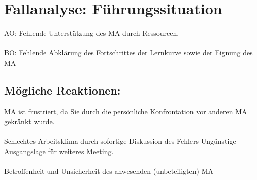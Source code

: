 \section{Fallanalyse: Führungssituation}
\ac{AO}: Fehlende Unterstützung des MA durch Ressourcen.\\
\\
\ac{BO}: Fehlende Abklärung des Fortschrittes der Lernkurve sowie der Eignung des \ac{MA}

\subsection*{Mögliche Reaktionen:}

\ac{MA} ist frustriert, da Sie durch die persönliche Konfrontation vor anderen \ac{MA} gekränkt wurde. \\
\\
Schlechtes Arbeitsklima durch sofortige Diskussion des Fehlers
Ungünstige Ausgangslage für weiteres Meeting. \\
\\
Betroffenheit und Unsicherheit des anwesenden (unbeteiligten) \ac{MA} 

